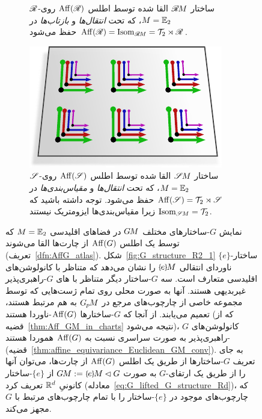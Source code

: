 \begin{figure}
\begin{subfigure}[b]{0.46\textwidth}
		\captionsetup{format=hang}
		\caption{\small
			$\mathscr{R}$-ساختار $\mathscr{R}\mkern-1.8muM$ القا شده توسط اطلس $\operatorname{Aff}(\mathscr{R})$ روی $M=\mathbb{E}_2$، که تحت \emph{انتقال‌ها} و \emph{بازتاب‌ها} در $\operatorname{Aff}(\mathscr{R}) = \operatorname{Isom}_{\mathscr{R}\mkern-1.8muM} = \mathcal{T}_2 \rtimes \mathscr{R}$ حفظ می‌شود.
			\\
		}
		\label{fig:G_structure_R2_3}
	\end{subfigure}
	\hfill
	\begin{subfigure}[b]{0.46\textwidth}
		\centering
		\includegraphics[width=.7\textwidth]{figures/G_structure_R2_4.pdf}
		\captionsetup{format=hang}
		\caption{\small
			$\mathscr{S}$-ساختار $\mathscr{S}\mkern-1.8muM$ القا شده توسط اطلس $\operatorname{Aff}(\mathscr{S})$ روی $M=\mathbb{E}_2$، که تحت \emph{انتقال‌ها} و \emph{مقیاس‌بندی‌ها} در $\operatorname{Aff}(\mathscr{S}) = \mathcal{T}_2 \rtimes \mathscr{S}$ حفظ می‌شود.
			توجه داشته باشید که $\operatorname{Isom}_{\mathscr{S}\mkern-1.8muM} = \mathcal{T}_2$ زیرا مقیاس‌بندی‌ها ایزومتریک نیستند.
		}
		\label{fig:G_structure_R2_4}
	\end{subfigure}
	\vspace*{0ex}
	\caption{\small
		نمایش $G$-ساختارهای مختلف $G\mkern-1.4muM$ در فضاهای اقلیدسی $M=\mathbb{E}_2$ که توسط یک اطلس $\operatorname{Aff}(G)$ از چارت‌ها القا می‌شوند (تعریف~\ref{dfn:AffG_atlas}).
		شکل~\ref{fig:G_structure_R2_1} $\{e\}$-ساختار ناوردای انتقالی $\eM$ را نشان می‌دهد که متناظر با کانولوشن‌های اقلیدسی متعارف است.
		سه $G$-ساختار دیگر متناظر با های $G$-راهبری‌پذیر غیربدیهی هستند.
		آنها به صورت محلی روی تمام ژست‌هایی که توسط مجموعه خاصی از چارچوب‌های مرجع در $G_{\mkern-1.3mu p}\mkern-1.2muM$ به هم مرتبط هستند، تعمیم می‌یابند.
		از آنجا که $G$-ساختارها $\operatorname{Aff}(G)$-ناوردا هستند (که از قضیه~\ref{thm:Aff_GM_in_charts} نتیجه می‌شود)، کانولوشن‌های $G$-راهبری‌پذیر به صورت سراسری نسبت به $\operatorname{Aff}(G)$ هموردا هستند (قضیه~\ref{thm:affine_equivariance_Euclidean_GM_conv}).
		به جای تعریف $G$-ساختارها از طریق یک اطلس $\operatorname{Aff}(G)$ از چارت‌ها، می‌توان آنها را از طریق یک ارتقای-$G$ به صورت $\GM := \eM \lhd G$ از $\{e\}$-ساختار کانونیِ $\mathbb{R}^d$ تعریف کرد (معادله~\eqref{eq:G_lifted_G_structure_Rd})، که چارچوب‌های موجود در $\{e\}$-ساختار را با تمام چارچوب‌های مرتبط با $G$ مجهز می‌کند.
	}
	\label{fig:G_structures_R2_main}
\end{figure}


